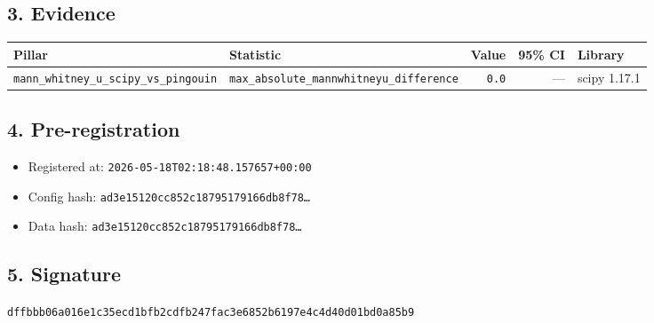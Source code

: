 \documentclass{article}
\begin{document}
\subsection*{3. Evidence}
\begin{tabular}{llrrl}\toprule
\textbf{Pillar} & \textbf{Statistic} & \textbf{Value} & \textbf{95\% CI} & \textbf{Library} \\\midrule
\texttt{mann\_whitney\_u\_scipy\_vs\_pingouin} & \texttt{max\_absolute\_mannwhitneyu\_difference} & \texttt{0.0} & --- & scipy 1.17.1 \\
\bottomrule\end{tabular}
\subsection*{4. Pre-registration}
\begin{itemize}
\item Registered at: \texttt{2026-05-18T02:18:48.157657+00:00}
\item Config hash: \texttt{ad3e15120cc852c18795179166db8f78\dots}
\item Data hash: \texttt{ad3e15120cc852c18795179166db8f78\dots}
\end{itemize}
\subsection*{5. Signature}
\texttt{dffbbb06a016e1c35ecd1bfb2cdfb247fac3e6852b6197e4c4d40d01bd0a85b9}\\
\end{document}

